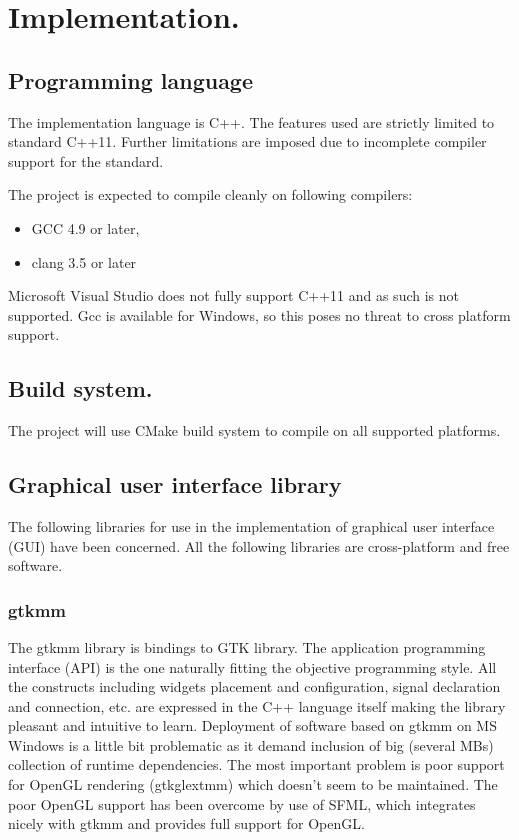 \chapter{Implementation.}
\label{chap:Implementation}

\section{Programming language}

The implementation language is C++. The features used are strictly limited to standard C++11. Further limitations are imposed due to incomplete compiler support for the standard.

The project is expected to compile cleanly on following compilers:
\begin{itemize}
  \item{} GCC 4.9 or later,
  \item{} clang 3.5 or later
\end{itemize}

Microsoft Visual Studio does not fully support C++11 and as such is not supported. Gcc is available for Windows, so this poses no threat to cross platform support.

\section{Build system.}

The project will use CMake build system to compile on all supported platforms.

\section{Graphical user interface library}

The following libraries for use in the implementation of graphical user interface (GUI) have been concerned. All the following libraries are cross-platform and free software.

\subsection{gtkmm}

The gtkmm library is bindings to GTK library. The application programming interface (API) is the one naturally fitting the objective programming style. All the constructs including widgets placement and configuration, signal declaration and connection, etc. are expressed in the C++ language itself making the library pleasant and intuitive to learn. Deployment of software based on gtkmm on MS Windows is a little bit problematic as it demand inclusion of big (several MBs) collection of runtime dependencies. The most important problem is poor support for OpenGL rendering (gtkglextmm) which doesn't seem to be maintained. The poor OpenGL support has been overcome by use of SFML, which integrates nicely with gtkmm and provides full support for OpenGL.

